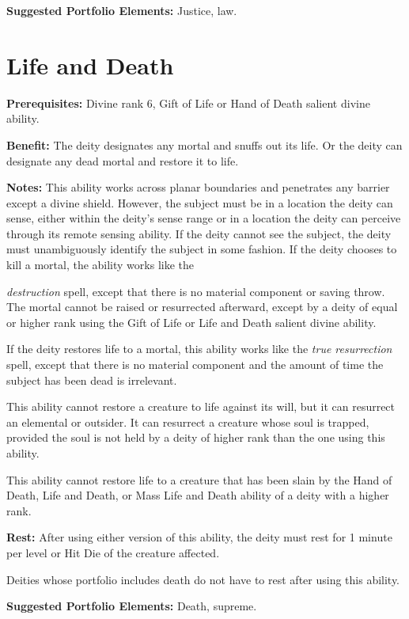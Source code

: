 \documentclass{article}
\begin{document}
\textbf{Suggested Portfolio Elements:} Justice, law.

\vspace{12pt}
\section*{Life and Death}

\textbf{Prerequisites:} Divine rank 6, Gift of Life or Hand of Death salient divine 
ability.

\textbf{Benefit:} The deity designates any mortal and snuffs out its life. Or the 
deity can designate any dead mortal and restore it to life.

\textbf{Notes:} This ability works across planar boundaries and penetrates any 
barrier except a divine shield. However, the subject must be in a location the 
deity can sense, either within the deity's sense range or in a location the deity 
can perceive through its remote sensing ability. If the deity cannot see the subject, 
the deity must unambiguously identify the subject in some fashion. If the deity 
chooses to kill a mortal, the ability works like the

\textit{destruction }spell, except that there is no material component or saving 
throw. The mortal cannot be raised or resurrected afterward, except by a deity 
of equal or higher rank using the Gift of Life or Life and Death salient divine 
ability.

If the deity restores life to a mortal, this ability works like the \textit{true 
resurrection }spell, except that there is no material component and the amount 
of time the subject has been dead is irrelevant.

This ability cannot restore a creature to life against its will, but it can resurrect 
an elemental or outsider. It can resurrect a creature whose soul is trapped, provided 
the soul is not held by a deity of higher rank than the one using this ability.

This ability cannot restore life to a creature that has been slain by the Hand 
of Death, Life and Death, or Mass Life and Death ability of a deity with a higher 
rank.

\textbf{Rest: }After using either version of this ability, the deity must rest 
for 1 minute per level or Hit Die of the creature affected.

Deities whose portfolio includes death do not have to rest after using this ability.

\textbf{Suggested Portfolio Elements:} Death, supreme.
\end{document}
